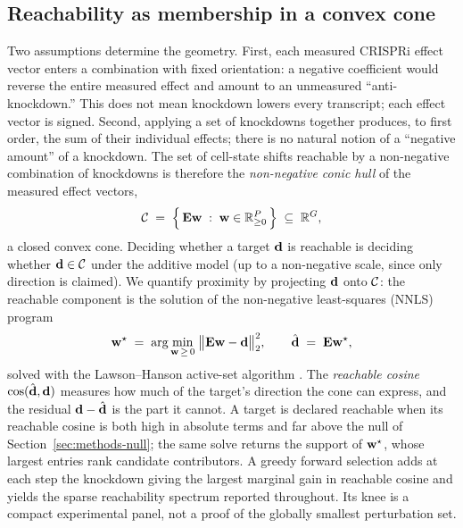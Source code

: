 \subsection{Reachability as membership in a convex cone}
\label{sec:methods-cone}
Two assumptions determine the geometry. First, each measured CRISPRi effect vector enters a
combination with fixed orientation: a negative coefficient would reverse the entire measured
effect and amount to an unmeasured ``anti-knockdown.'' This does not mean knockdown lowers
every transcript; each effect vector is signed. Second, applying a set of knockdowns together
produces, to first
order, the sum of their individual effects; there is no natural notion of a
``negative amount'' of a knockdown. The set of cell-state shifts reachable by a non-negative
combination of knockdowns is therefore the \emph{non-negative conic hull} of the measured
effect vectors,
\begin{equation}
\mathcal{C} \;=\; \Bigl\{\, \mathbf{E}\mathbf{w} \;:\; \mathbf{w} \in \mathbb{R}_{\geq 0}^{P} \,\Bigr\}
\;\subseteq\; \mathbb{R}^{G},
\label{eq:cone}
\end{equation}
a closed convex cone. Deciding whether a target $\mathbf{d}$ is reachable is deciding whether
$\mathbf{d}\in\mathcal{C}$ under the additive model (up to a non-negative scale, since only direction is
claimed). We quantify
proximity by projecting $\mathbf{d}$ onto $\mathcal{C}$: the reachable component is the solution of the
non-negative least-squares (NNLS) program
\begin{equation}
\mathbf{w}^{\star} \;=\; \arg\min_{\mathbf{w} \,\geq\, 0}\; \bigl\lVert \mathbf{E}\mathbf{w} - \mathbf{d} \bigr\rVert_2^{2},
\qquad
\hat{\mathbf{d}} \;=\; \mathbf{E}\mathbf{w}^{\star},
\label{eq:nnls}
\end{equation}
solved with the Lawson--Hanson active-set algorithm \citep{LawsonHanson1974}. The
\emph{reachable cosine} $\cos(\hat{\mathbf{d}},\mathbf{d})$ measures how much of the target's direction
the cone can express, and the residual $\mathbf{d}-\hat{\mathbf{d}}$ is the part it cannot. A target is
declared reachable when its reachable cosine is both high in absolute terms and far above the
null of Section~\ref{sec:methods-null}; the same solve returns the support of $\mathbf{w}^{\star}$,
whose largest entries rank candidate contributors. A greedy forward selection adds at each
step the knockdown giving the largest marginal gain in reachable cosine and yields the sparse
reachability spectrum reported throughout. Its knee is a compact experimental panel, not a
proof of the globally smallest perturbation set.


